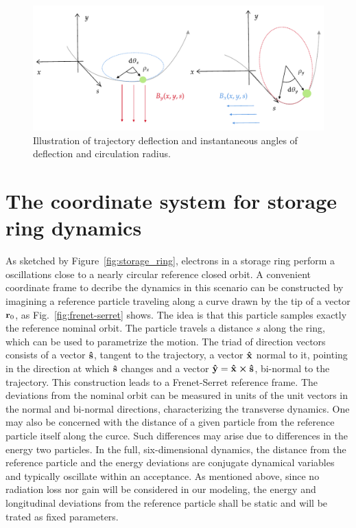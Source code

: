 \begin{figure}[htb]
    \centering
    \includegraphics[width=\textwidth]{Images/deflections.pdf}
    \caption{Illustration of trajectory deflection and instantaneous angles of deflection and circulation radius.}
    \label{fig:deflec_angles}
\end{figure}
\section{The coordinate system for storage ring dynamics}
As sketched by Figure~\ref{fig:storage_ring}, electrons in a storage ring perform a oscillations close to a nearly circular reference closed orbit. A convenient coordinate frame to decribe the dynamics in this scenario can be constructed by imagining a reference particle traveling along a curve drawn by the tip of a vector $\vb{r}_0$, as Fig.~\ref{fig:frenet-serret} shows. The idea is that this particle samples exactly the reference nominal orbit. The particle travels a distance $s$ along the ring, which can be used to parametrize the motion. The triad of direction vectors consists of a vector $\vu{s}$, tangent to the trajectory, a vector $\vu{x}$ normal to it, pointing in the direction at which $\vu{s}$ changes and a vector $\vu{y}=\vu{x}\cross\vu{s}$, bi-normal to the trajectory. This construction leads to a Frenet-Serret reference frame. The deviations from the nominal orbit can be measured in units of the unit vectors in the normal and bi-normal directions, characterizing the transverse dynamics. One may also be concerned with the distance of a given particle from the reference particle itself along the curce. Such differences may arise due to differences in the energy two particles. In the full, six-dimensional dynamics, the distance from the reference particle and the energy deviations are conjugate dynamical variables and typically oscillate within an acceptance. As mentioned above, since no radiation loss nor gain will be considered in our modeling, the energy and longitudinal deviations from the reference particle shall be static and will be trated as fixed parameters.

